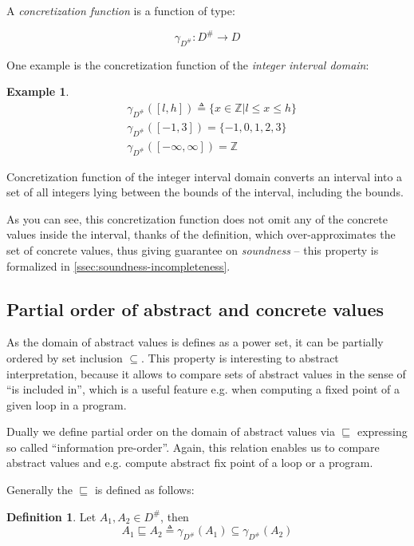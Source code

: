 \documentclass[12pt,oneside]{fithesis2}
\theoremstyle{definition}
\newtheorem{exmp}{Example}[section]
\newtheorem{definition}{Definition}
\begin{document}
A \textit{concretization function} is a function of type:

\[
\gamma_{D^\#}\colon D^\# \to D
\]

One example is the concretization function of the \textit{integer interval domain}:

\begin{exmp}
  \begin{align*}
    &\gamma_{D^\#}([l,h]) \triangleq \{x \in \mathbb Z | l \le x \le h\}\\
    &\gamma_{D^\#}([-1,3]) = \{-1, 0, 1, 2, 3\}\\
    &\gamma_{D^\#}([-\infty, \infty]) = \mathbb Z
  \end{align*}
\end{exmp}

Concretization function of the integer interval domain converts an interval into a set of all integers lying between the bounds of the interval, including the bounds.

As you can see, this concretization function does not omit any of the concrete values inside the interval, thanks of the definition, which over-approximates the set of concrete values, thus giving guarantee on \textit{soundness} -- this property is formalized in \ref{ssec:soundness-incompleteness}.

\subsection{Partial order of abstract and concrete values}

As the domain of abstract values is defines as a power set, it can be partially ordered by set inclusion $\subseteq$. This property is interesting to abstract interpretation, because it allows to compare sets of abstract values in the sense of ``is included in'', which is a useful feature e.g. when computing a fixed point of a given loop in a program.

Dually we define partial order on the domain of abstract values via $\sqsubseteq$ expressing so called ``information pre-order''. Again, this relation enables us to compare abstract values and e.g. compute abstract fix point of a loop or a program.

Generally the $\sqsubseteq$ is defined as follows:

\begin{definition}
  Let $A_1, A_2 \in D^\#$, then
  \[
    A_1 \sqsubseteq A_2 \triangleq \gamma_{D^\#}(A_1) \subseteq \gamma_{D^\#}(A_2)
  \]
\end{definition}
\end{document}
